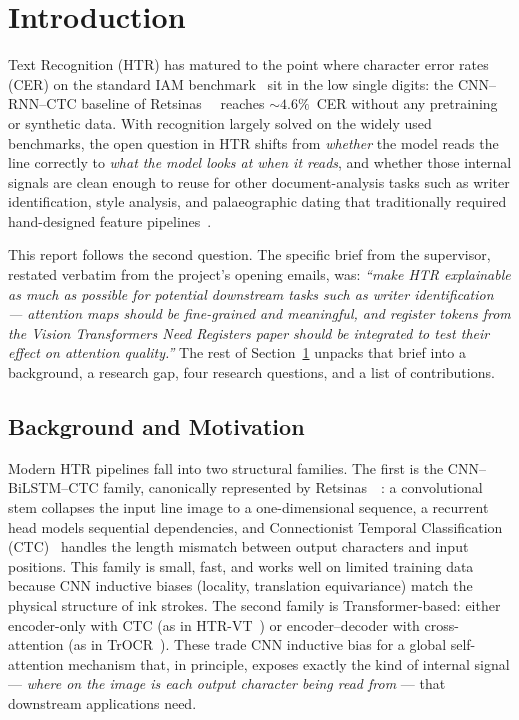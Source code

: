 \section{Introduction}
\label{sec:introduction}

 Text Recognition (HTR) has matured to the point where character error rates (CER) on the standard IAM benchmark~\cite{marti2002iam} sit in the low single digits: the CNN--RNN--CTC baseline of Retsinas~\etal~\cite{retsinas2022htrbestpractices} reaches ${\sim}4.6\%$~CER without any pretraining or synthetic data. With recognition largely solved on the widely used benchmarks, the open question in HTR shifts from \emph{whether} the model reads the line correctly to \emph{what the model looks at when it reads}, and whether those internal signals are clean enough to reuse for other document-analysis tasks such as writer identification, style analysis, and palaeographic dating that traditionally required hand-designed feature pipelines~\cite{souibgui2022vlac}.

This report follows the second question. The specific brief from the supervisor, restated verbatim from the project's opening emails, was: \emph{``make HTR explainable as much as possible for potential downstream tasks such as writer identification --- attention maps should be fine-grained and meaningful, and register tokens from the Vision Transformers Need Registers paper should be integrated to test their effect on attention quality.''} The rest of Section~\ref{sec:introduction} unpacks that brief into a background, a research gap, four research questions, and a list of contributions.

\subsection{Background and Motivation}
\label{sec:background}

Modern HTR pipelines fall into two structural families. The first is the CNN--BiLSTM--CTC family, canonically represented by Retsinas~\etal~\cite{retsinas2022htrbestpractices}: a convolutional stem collapses the input line image to a one-dimensional sequence, a recurrent head models sequential dependencies, and Connectionist Temporal Classification (CTC)~\cite{graves2006ctc} handles the length mismatch between output characters and input positions. This family is small, fast, and works well on limited training data because CNN inductive biases (locality, translation equivariance) match the physical structure of ink strokes. The second family is Transformer-based: either encoder-only with CTC (as in HTR-VT~\cite{li2024htrvt}) or encoder--decoder with cross-attention (as in TrOCR~\cite{li2023trocr}). These trade CNN inductive bias for a global self-attention mechanism that, in principle, exposes exactly the kind of internal signal --- \emph{where on the image is each output character being read from} --- that downstream applications need.

